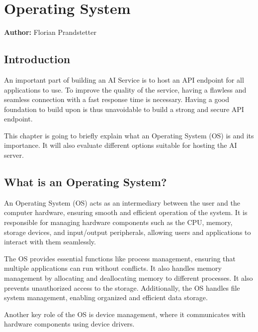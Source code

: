 \chapter{Operating System }
\label{chap:Operating_Systems_used}
\textbf{Author:} Florian Prandstetter

\author{Florian Prandstetter}

\section {Introduction}

An important part of building an AI Service is to host an API endpoint for all applications to use. To improve the quality of the service, having a flawless and seamless connection with a fast response time is necessary.
Having a good foundation to build upon is thus unavoidable to build a strong and secure API endpoint. 

This chapter is going to briefly explain what an Operating System (OS) is and its importance.
It will also evaluate different options suitable for hosting the AI server.

\section{What is an Operating System?}
\label{sec:WhatIsAnOs}

An Operating System (OS) acts as an intermediary between the user and the computer hardware, ensuring smooth and efficient operation of the system. It is responsible for managing hardware components such as the CPU, memory, storage devices, and input/output peripherals, allowing users and applications to interact with them seamlessly.

The OS provides essential functions like process management, ensuring that multiple applications can run without conflicts. It also handles memory management by allocating and deallocating memory to different processes. It also prevents unauthorized access to the storage.
Additionally, the OS handles file system management, enabling organized and efficient data storage. 

Another key role of the OS is device management, where it communicates with hardware components using device drivers.

